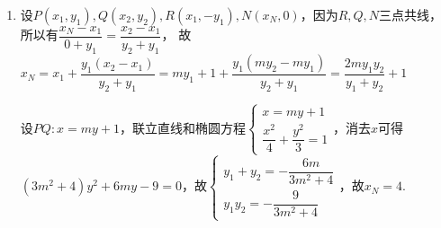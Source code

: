 \begin{enumerate}
\begin{jieda}
\begin{enumerate}
            由 $\vv{{F}_{1}M} = \dfrac{2}{3}\vv{{F}_{1}P}$ ,得 $\left\{\begin{array}{l}
                 {x}_{2} + 1 = \dfrac{2}{3}\left( {{x}_{1} + 1}\right) \\
                 {y}_{2} = \dfrac{2}{3}{y}_{1}
            \end{array}\right.$
            点 $M$ 线段 $A{F}_{2}$ 上,所以 ${x}_{2},{y}_{2}$ 满足方程为 ${y}_{2} =  - \sqrt{3}\left( {{x}_{2} - 1}\right)$，故有${y}_{1} =  - \sqrt{3}\left( {{x}_{1} - 2}\right)$，代入椭圆方程,得 $5{x}_{1}^{2} - {16}{x}_{1} + {12} = 0$，因为 ${x}_{1} > 0$ ,所以 ${x}_{1} = \dfrac{6}{5}$ .
            \item 设$P(x_1, y_1), Q(x_2, y_2), R(x_1, -y_1), N(x_N, 0)$，因为$R,Q,N$三点共线，所以有$\dfrac{x_N - x_1}{0+y_1} = \dfrac{x_2-x_1}{y_2+y_1}$， 故$x_N = x_1 + \dfrac{y_1(x_2-x_1)}{y_2+y_1} = my_1 + 1 + \dfrac{y_1 (my_2-my_1)}{y_2+y_1} = \dfrac{2my_1y_2}{y_1+y_2}+1$

            设$PQ: x = my+1$，联立直线和椭圆方程$\left\{\begin{array}{l}
                 x = my+1 \\
                 \dfrac{x^2}{4}+\dfrac{y^2}{3} = 1
            \end{array}\right.$，消去$x$可得$(3m^2+4)y^2+6my-9=0$，故$\left\{\begin{array}{l}
                 y_1+y_2 = -\dfrac{6m}{3m^2+4} \\
                 y_1y_2 = -\dfrac{9}{3m^2+4}
            \end{array}\right.$，故$x_N = 4$.


\end{enumerate}
\end{jieda}
\end{enumerate}
